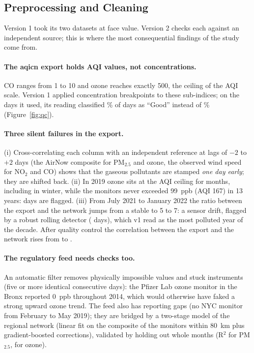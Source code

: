 \documentclass[11pt]{article}
\begin{document}
\subsection{Preprocessing and Cleaning}

Version 1 took its two datasets at face value. Version 2 checks each against an independent source; this is where the most consequential findings of the study come from.

\paragraph{The aqicn export holds AQI values, not concentrations.} CO ranges from 1 to 10 and ozone reaches exactly 500, the ceiling of the AQI scale. Version 1 applied concentration breakpoints to these sub-indices; on the days it used, its reading classified \VoneGood{}\% of days as ``Good'' instead of \VtwoGood{}\% (Figure~\ref{fig:qc}).

\paragraph{Three silent failures in the export.} (i) Cross-correlating each column with an independent reference at lags of $-2$ to $+2$ days (the AirNow composite for PM$_{2.5}$ and ozone, the observed wind speed for NO$_2$ and CO) shows that the gaseous pollutants are stamped \emph{one day early}; they are shifted back. (ii) In 2019 ozone sits at the AQI ceiling for months, including in winter, while the monitors never exceeded 99~ppb (AQI 167) in 13 years: \FlagOz{} days are flagged. (iii) From July 2021 to January 2022 the ratio between the export and the network jumps from a stable \StableRatio{} to 5 to 7: a sensor drift, flagged by a robust rolling detector (\FlagPM{} days), which v1 read as the most polluted year of the decade. After quality control the correlation between the export and the network rises from \CorrBefore{} to \CorrAfter.

\paragraph{The regulatory feed needs checks too.} An automatic filter removes physically impossible values and stuck instruments (five or more identical consecutive days): the Pfizer Lab ozone monitor in the Bronx reported 0~ppb throughout 2014, which would otherwise have faked a strong upward ozone trend. The feed also has reporting gaps (no NYC monitor from February to May 2019); they are bridged by a two-stage model of the regional network (linear fit on the composite of the monitors within 80~km plus gradient-boosted corrections), validated by holding out whole months (R$^2$ \FillRtwoPM{} for PM$_{2.5}$, \FillRtwoOz{} for ozone).
\end{document}
